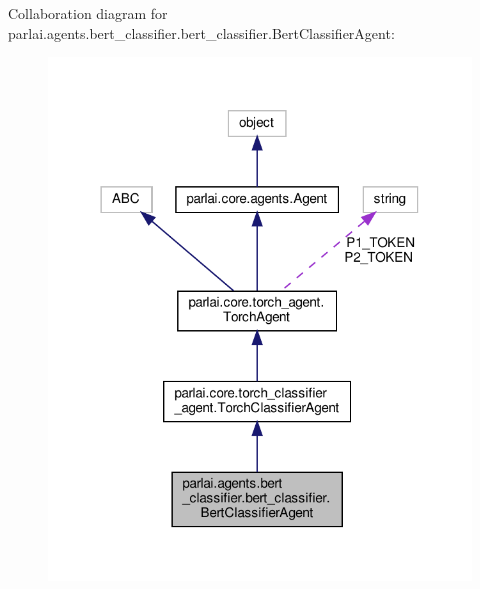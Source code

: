 Collaboration diagram for parlai.\+agents.\+bert\+\_\+classifier.\+bert\+\_\+classifier.\+Bert\+Classifier\+Agent\+:
\nopagebreak
\begin{figure}[H]
\begin{center}
\leavevmode
\includegraphics[width=318pt]{d0/d0e/classparlai_1_1agents_1_1bert__classifier_1_1bert__classifier_1_1BertClassifierAgent__coll__graph}
\end{center}
\end{figure}
